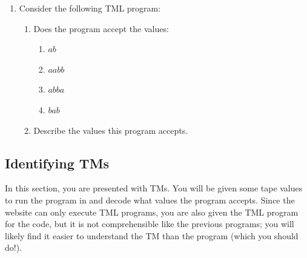 \begin{appendices}
\begin{enumerate}
    \item Consider the following TML program:
    
    \begin{enumerate}
        \item Does the program accept the values:
        \begin{enumerate}
            \item $ab$
            \item $aabb$
            \item $abba$
            \item $bab$
        \end{enumerate}
        
        \item Describe the values this program accepts.
    \end{enumerate}
\end{enumerate}

\newpage

\subsection{Identifying TMs}
In this section, you are presented with TMs. You will be given some tape values to run the program in and decode what values the program accepts. Since the website can only execute TML programs, you are also given the TML program for the code, but it is not comprehensible like the previous programs; you will likely find it easier to understand the TM than the program (which you should do!). 
\begin{figure}[htb]
    \centering
    \begin{subfigure}{0.8\textwidth}
        \centering
\end{subfigure}
\end{figure}
\end{appendices}
